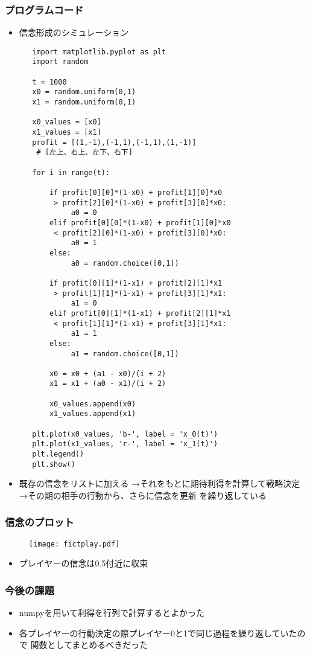\documentclass[dvipdfmx,fleqn,handout]{beamer}
\begin{document}
\begin{frame}\frametitle{プログラムコード}
 \begin{itemize}\setlength{\parskip}{0.5em}
  \item
  信念形成のシミュレーション
   \begin{verbatim}
   import matplotlib.pyplot as plt
   import random
   
   t = 1000
   x0 = random.uniform(0,1)
   x1 = random.uniform(0,1)
   
   x0_values = [x0]
   x1_values = [x1]
   profit = [(1,-1),(-1,1),(-1,1),(1,-1)]
    # [左上、右上、左下、右下]
   
   for i in range(t):
   
       if profit[0][0]*(1-x0) + profit[1][0]*x0
        > profit[2][0]*(1-x0) + profit[3][0]*x0:
            a0 = 0
       elif profit[0][0]*(1-x0) + profit[1][0]*x0
        < profit[2][0]*(1-x0) + profit[3][0]*x0:
            a0 = 1
       else:
            a0 = random.choice([0,1])
   
       if profit[0][1]*(1-x1) + profit[2][1]*x1
        > profit[1][1]*(1-x1) + profit[3][1]*x1:
            a1 = 0
       elif profit[0][1]*(1-x1) + profit[2][1]*x1
        < profit[1][1]*(1-x1) + profit[3][1]*x1:
            a1 = 1
       else:
            a1 = random.choice([0,1])
   
       x0 = x0 + (a1 - x0)/(i + 2)
       x1 = x1 + (a0 - x1)/(i + 2)
   
       x0_values.append(x0)
       x1_values.append(x1)
   
   plt.plot(x0_values, 'b-', label = 'x_0(t)')
   plt.plot(x1_values, 'r-', label = 'x_1(t)')
   plt.legend()
   plt.show()
   \end{verbatim}
  \item
  既存の信念をリストに加える
  →それをもとに期待利得を計算して戦略決定
  →その期の相手の行動から、さらに信念を更新
  を繰り返している
 \end{itemize}
\end{frame}


\begin{frame}\frametitle{信念のプロット}
 \begin{figure}
  \centering
  \texttt{[image: fictplay.pdf]}
  \label{fig:fictplay}
 \end{figure}
  \begin{itemize}\setlength{\parskip}{0.5em}
   \item
   プレイヤーの信念は0.5付近に収束
  \end{itemize}
\end{frame}


\begin{frame}\frametitle{今後の課題}
 \begin{itemize}\setlength{\parskip}{0.5em}
  \item
  numpyを用いて利得を行列で計算するとよかった
  \item
  各プレイヤーの行動決定の際プレイヤー0と1で同じ過程を繰り返していたので
  関数としてまとめるべきだった
 \end{itemize}
\end{frame}
\end{document}
